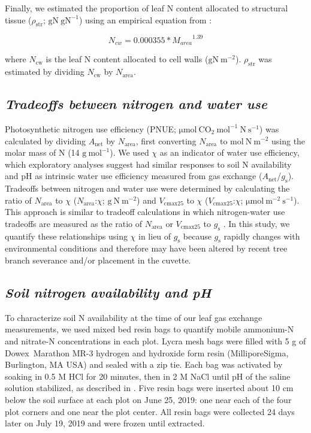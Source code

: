     Finally, we estimated the proportion of leaf N content allocated to structural tissue ($\rho_\mathrm{{str}}$; $\mathrm{gN\ gN^{-1}}$) using an empirical equation from :

    \begin{equation} \label{eqn_2.14}
        N_{cw}=0.000355*{M_{area}}^{1.39}
    \end{equation}
    
    \noindent where $N_\mathrm{cw}$ is the leaf N content allocated to cell walls ($\mathrm{gN\ m^{-2}}$). $\rho_\mathrm{{str}}$ was estimated by dividing $N_\mathrm{cw}$ by $N_\mathrm{area}$.


    \subsection{\textit{Tradeoffs between nitrogen and water use}}

    Photosynthetic nitrogen use efficiency (PNUE; $\mathrm{\mu mol\ CO_2\ mol^{-1}\ N\ s^{-1}}$) was calculated by dividing $A_\mathrm{net}$ by $N_\mathrm{area}$, first converting $N_\mathrm{area}$ to $\mathrm{mol\ N\ m^{-2}}$ using the molar mass of N (14 $\mathrm{g\ mol^{-1}}$). We used $\chi$ as an indicator of water use efficiency, which exploratory analyses suggest had similar responses to soil N availability and pH as intrinsic water use efficiency measured from gas exchange ($A_\mathrm{net}$/$g_\mathrm{s}$). Tradeoffs between nitrogen and water use were determined by calculating the ratio of $N_\mathrm{area}$ to $\chi$ ($N_\mathrm{area}$:$\chi$; $\mathrm{g\ N\ m^{-2}}$) and $V_\mathrm{cmax25}$ to $\chi$ ($V_\mathrm{cmax25}$:$\chi$; $\mathrm{\mu mol\ m^{-2}\ s^{-1}}$). This approach is similar to tradeoff calculations in which nitrogen-water use tradeoffs are measured as the ratio of $N_\mathrm{area}$ or $V_\mathrm{cmax25}$ to $g_\mathrm{s}$ . In this study, we quantify these relationships using $\chi$ in lieu of $g_\mathrm{s}$ because $g_\mathrm{s}$ rapidly changes with environmental conditions and therefore may have been altered by recent tree branch severance and/or placement in the cuvette.

    \subsection{\textit{Soil nitrogen availability and pH}}
    To characterize soil N availability at the time of our leaf gas exchange measurements, we used mixed bed resin bags to quantify mobile ammonium-N and nitrate-N concentrations in each plot. Lycra mesh bags were filled with 5 g of Dowex\textregistered\ Marathon MR-3 hydrogen and hydroxide form resin (MilliporeSigma, Burlington, MA USA) and sealed with a zip tie. Each bag was activated by soaking in 0.5 M HCl for 20 minutes, then in 2 M NaCl until pH of the saline solution stabilized, as described in . Five resin bags were inserted about 10 cm below the soil surface at each plot on June 25, 2019: one near each of the four plot corners and one near the plot center. All resin bags were collected 24 days later on July 19, 2019 and were frozen until extracted.
    
